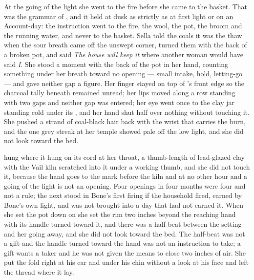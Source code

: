 At the going of the light she went to the fire before she came to the basket. That was the grammar of , and it held at dusk as strictly as at first light or on an Account-day: the instruction went to the fire, the wool, the pot, the broom and the running water, and never to the basket. Sella told the coals it was the thaw when the sour breath came off the unswept corner, turned them with the back of a broken pot, and said \emph{The house will keep it} where another woman would have said \emph{I}. She stood a moment with the back of the pot in her hand, counting something under her breath toward no opening --- small intake, hold, letting-go --- and gave neither gap a figure. Her finger stayed on top of 's front edge so the charcoal tally beneath remained unread; her lips moved along a row standing with two gaps and neither gap was entered; her eye went once to the clay jar standing cold under its , and her hand shut half over nothing without touching it. She pushed a strand of coal-black hair back with the wrist that carries the burn, and the one grey streak at her temple showed pale off the low light, and she did not look toward the bed.

 hung where it hung on its cord at her throat, a thumb-length of lead-glazed clay with the Vail kiln scratched into it under a working thumb, and she did not touch it, because the hand goes to the mark before the kiln and at no other hour and a going of the light is not an opening. Four openings in four months were four and not a rule; the next stood in Bone's first firing if the household fired, earned by Bone's own light, and was not brought into a day that had not earned it. When she set the pot down on  she set the rim two inches beyond the reaching hand with its handle turned toward it, and there was a half-beat between the setting and her going away, and she did not look toward the bed. The half-beat was not a gift and the handle turned toward the hand was not an instruction to take; a gift wants a taker and he was not given the means to close two inches of air. She put the fold right at his ear and under his chin without a look at his face and left the thread where it lay.

